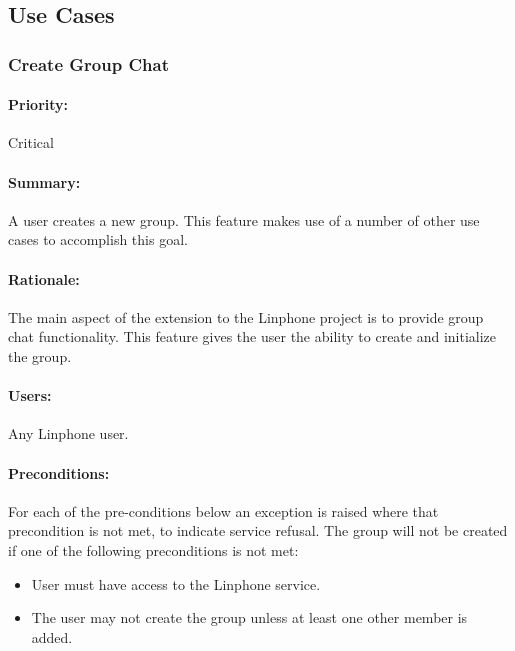 \documentclass[11pt]{article}
\begin{document}
\subsection{Use Cases}
\subsubsection{Create Group Chat} \label{UC-create-group}
\paragraph{Priority:}Critical
\paragraph{Summary:} A user creates a new group. This feature makes use of a number of other use cases to accomplish this goal.
\paragraph{Rationale:} The main aspect of the extension to the Linphone project is to provide group chat functionality. This feature gives the user the ability to create and initialize the group.
\paragraph{Users:}  Any Linphone user.
\paragraph{Preconditions:}For each of the pre-conditions below an exception is raised where that precondition is not met, to indicate service refusal.
The group will not be created if one of the following preconditions is not met:
\begin{itemize}
\item	User must have access to the Linphone service.
\item	The user may not create the group unless at least one other member is added.
\end{itemize}
\end{document}
